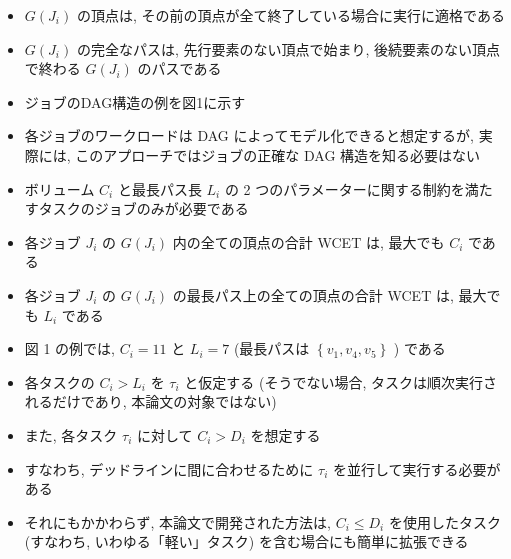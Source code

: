 \begin{frame}{}
    \begin{itemize}
        \item $G\left(J_{i}\right)$ の頂点は, その前の頂点が全て終了している場合に実行に適格である
\item $G\left(J_{i}\right)$ の完全なパスは, 先行要素のない頂点で始まり, 後続要素のない頂点で終わる $G\left(J_{i}\right)$ のパスである
\item ジョブのDAG構造の例を図1に示す
    \end{itemize}
\end{frame}

\begin{frame}{}
    \begin{itemize}
        \item 各ジョブのワークロードは DAG によってモデル化できると想定するが, 実際には, このアプローチではジョブの正確な DAG 構造を知る必要はない
\item ボリューム $C_{i}$ と最長パス長 $L_{i}$ の 2 つのパラメーターに関する制約を満たすタスクのジョブのみが必要である
    \end{itemize}
    \begin{itemize}
        \item  各ジョブ $J_{i}$ の $G\left(J_{i}\right)$ 内の全ての頂点の合計 WCET は, 最大でも $C_{i}$ である

        \item  各ジョブ $J_{i}$ の $G\left(J_{i}\right)$ の最長パス上の全ての頂点の合計 WCET は, 最大でも $L_{i}$ である

    \end{itemize}
\end{frame}

\begin{frame}{}
    \begin{itemize}
        \item 図 1 の例では,  $C_{i}=11$ と $L_{i}=7$ (最長パスは $\left\{v_{1}, v_{4}, v_{5}\right\}$ ) である
\item 各タスクの $C_{i}>L_{i}$ を $\tau_{i}$ と仮定する (そうでない場合, タスクは順次実行されるだけであり, 本論文の対象ではない)
\item また, 各タスク $\tau_{i}$ に対して $C_{i}>D_{i}$ を想定する
\item すなわち, デッドラインに間に合わせるために $\tau_{i}$ を並行して実行する必要がある
\item それにもかかわらず, 本論文で開発された方法は, $C_{i} \leq D_{i}$ を使用したタスク (すなわち, いわゆる「軽い」タスク) を含む場合にも簡単に拡張できる
    \end{itemize}
\end{frame}
